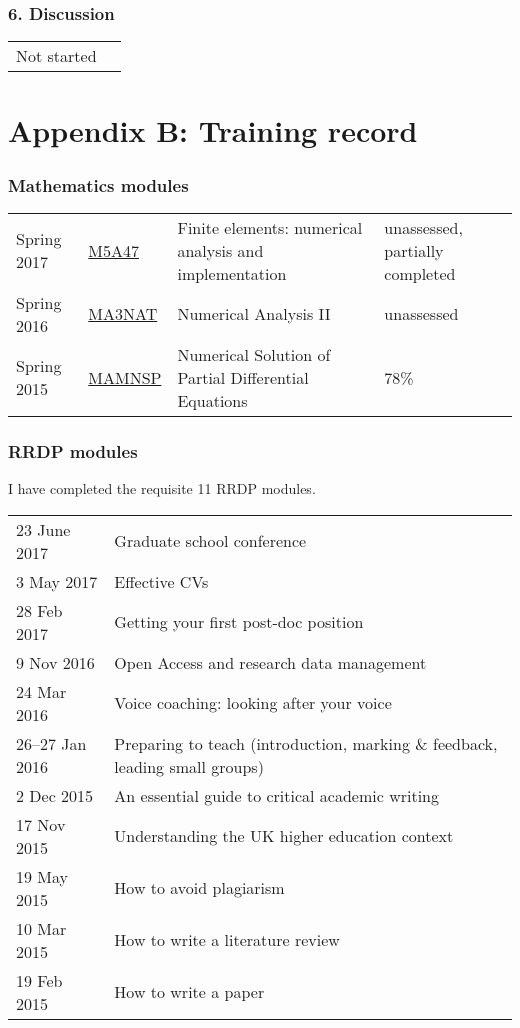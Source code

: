 \documentclass[a4paper,11pt]{article}
\begin{document}
\subsubsection*{6. Discussion}
\vspace*{0.5em}

\begin{tabularx}{\linewidth}{>{\hsize=0.9in}X X}
Not started & 
\end{tabularx}


\newpage

\section*{Appendix B: Training record}

\subsubsection*{Mathematics modules}
\begin{tabular}{l l l l}
Spring 2017	& \href{https://finite-element.github.io}{M5A47}  & Finite elements: numerical analysis and implementation & unassessed, partially completed \\
Spring 2016	& \href{www.reading.ac.uk/module/document.aspx?modP=MA3NAT&modYR=1516}{MA3NAT} & Numerical Analysis II & unassessed \\
Spring 2015	& \href{www.reading.ac.uk/modules/document.aspx?modP=MAMNSP&modYR=1415}{MAMNSP} & Numerical Solution of Partial Differential Equations  & 78\% \\
\end{tabular}

\subsubsection*{RRDP modules}
I have completed the requisite 11 RRDP modules.

\vspace*{0.5em}
\begin{tabular}{l l}
23 June 2017    & Graduate school conference \\
3 May 2017	& Effective CVs \\
28 Feb 2017	& Getting your first post-doc position \\
9 Nov 2016      & Open Access and research data management \\
24 Mar 2016	& Voice coaching: looking after your voice \\
26--27 Jan 2016 & Preparing to teach (introduction, marking \& feedback, leading small groups) \\
2 Dec 2015	& An essential guide to critical academic writing \\
17 Nov 2015	& Understanding the UK higher education context \\
19 May 2015	& How to avoid plagiarism \\
10 Mar 2015	& How to write a literature review \\
19 Feb 2015	& How to write a paper \\
\end{tabular}
\end{document}
